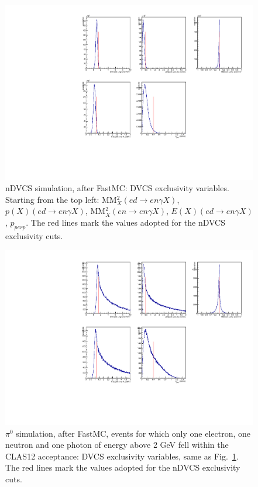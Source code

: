 \begin{figure}
\begin{center}
\includegraphics[width=120mm]{dvcs_excl_vars_noFT_100days.pdf}
\caption[nDVCS simulation, after FastMC]
{nDVCS simulation, after FastMC: DVCS exclusivity variables. Starting from the top left: MM$^2_X(ed\to en\gamma X)$, $p(X)(ed\to en\gamma X)$,  MM$^2_X(en\to en\gamma X)$, $E(X)(ed\to en\gamma X)$, $p_{perp}$. The red lines mark the values adopted for the nDVCS exclusivity cuts.}
\label{dvcs_excl}
\end{center}
\end{figure}

\begin{figure}
\begin{center}
\includegraphics[width=120mm]{pi0_excl_vars_noFT_100days.pdf}
\caption[$\pi^0$ simulation, after FastMC]
{$\pi^0$ simulation, after FastMC, events for which only one electron, one neutron and one photon of energy above 2 GeV fell within the CLAS12 acceptance: DVCS exclusivity variables, same as Fig.~\ref{dvcs_excl}. The red lines mark the values adopted for the nDVCS exclusivity cuts.}
\label{pi0_excl}
\end{center}
\end{figure}

